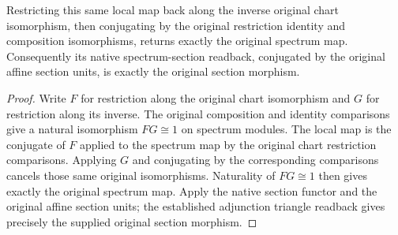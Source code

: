 \begin{lemma}
\label{lem:di-affine-local-map-spec-readback}
\leanok
{}
Restricting this same local map back along the inverse original chart
isomorphism, then conjugating by the original restriction identity and
composition isomorphisms, returns exactly the original spectrum map.
Consequently its native spectrum-section readback, conjugated by the
original affine section units, is exactly the original section morphism.
\end{lemma}
\begin{proof}
Write $F$ for restriction along the original chart isomorphism and $G$
for restriction along its inverse. The original composition and identity
comparisons give a natural isomorphism $FG\cong1$ on spectrum modules.
The local map is the conjugate of $F$ applied to the spectrum map by the
original chart restriction comparisons. Applying $G$ and conjugating by
the corresponding comparisons cancels those same original isomorphisms.
Naturality of $FG\cong1$ then gives exactly the original spectrum map.
Apply the native section functor and the original affine section units;
the established adjunction triangle readback gives precisely
the supplied original section morphism.
\end{proof}

